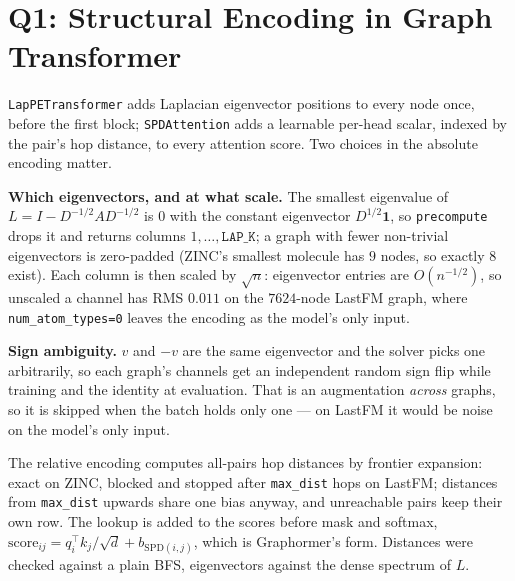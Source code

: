 \section{Q1: Structural Encoding in Graph Transformer}

\texttt{LapPETransformer} adds Laplacian eigenvector positions to every node once, before the
first block; \texttt{SPDAttention} adds a learnable per-head scalar, indexed by the pair's hop
distance, to every attention score. Two choices in the absolute encoding matter.

\textbf{Which eigenvectors, and at what scale.} The smallest eigenvalue of
$L = I - D^{-1/2} A D^{-1/2}$ is $0$ with the constant eigenvector $D^{1/2}\mathbf{1}$, so
\texttt{precompute} drops it and returns columns
$1,\dots,\texttt{LAP\_K}$; a graph with fewer non-trivial eigenvectors is zero-padded (ZINC's
smallest molecule has $9$ nodes, so exactly $8$ exist). Each column is then scaled by $\sqrt{n}$:
eigenvector entries are $O(n^{-1/2})$, so unscaled a channel has RMS $0.011$ on the $7624$-node
LastFM graph, where \texttt{num\_atom\_types=0} leaves the encoding as the model's only input.

\textbf{Sign ambiguity.} $v$ and $-v$ are the same eigenvector and the solver picks one
arbitrarily, so each graph's channels get an independent random sign flip while training and the
identity at evaluation. That is an augmentation \emph{across} graphs, so it is skipped when the
batch holds only one --- on LastFM it would be noise on the model's only input.

The relative encoding computes all-pairs hop distances by frontier expansion: exact on ZINC,
blocked and stopped after \texttt{max\_dist} hops on LastFM; distances from \texttt{max\_dist}
upwards share one bias anyway, and unreachable pairs keep their own row. The lookup is added to
the scores before mask and softmax,
$\mathrm{score}_{ij} = q_i^\top k_j/\sqrt{d} + b_{\mathrm{SPD}(i,j)}$, which is Graphormer's
form. Distances were checked against a plain BFS, eigenvectors against the dense spectrum of
$L$.


